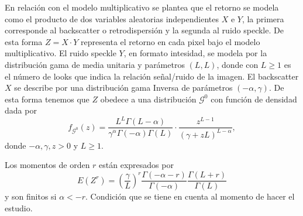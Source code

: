 \documentclass[11pt]{article}
\begin{document}


En  relación con el modelo multiplicativo se plantea que el retorno se modela como el producto de dos variables aleatorias independientes $X$ e $Y$, la primera corresponde al backscatter o retrodispersión y la segunda al ruido speckle. 
De esta forma $Z=X\cdot Y$ representa el retorno en cada pixel bajo el modelo multiplicativo.
El ruido speckle $Y$, en formato intesidad, se modela por la distribución gama de media unitaria y parámetros $(L,L)$, donde con $L\geq 1$ es el número de looks que indica la relación señal/ruido de la imagen. 
El backscatter $X$ se describe por una distribución gama Inversa de parámetros $(-\alpha ,\gamma)$. 
De esta forma tenemos que $Z$ obedece a una distribución $\mathcal G^0$ con función de densidad 	dada por
\begin{equation*}
f_{\mathcal{G}^{0}}( z) =\frac{L^{L}\Gamma ( L-\alpha
	) }{\gamma ^{\alpha }\Gamma ( -\alpha ) \Gamma (
	L) }\cdot  
\frac{z^{L-1}}{( \gamma +zL) ^{L-\alpha }},%
\label{ec_dens_gI0}
\end{equation*}
donde $-\alpha,\gamma ,z>0$ y $L\geq 1$.

Los momentos de orden $r$ están expresados por
\begin{equation*}
E\left(Z^{r}\right)=\left(\frac{\gamma}{L}\right)^{r} \frac{\Gamma(-\alpha-r)}{\Gamma(-\alpha)} \frac{\Gamma(L+r)}{\Gamma(L)}
\end{equation*}
y son finitos si $\alpha<-r$. Condición que se tiene en cuenta al momento de hacer el estudio.
\end{document}
